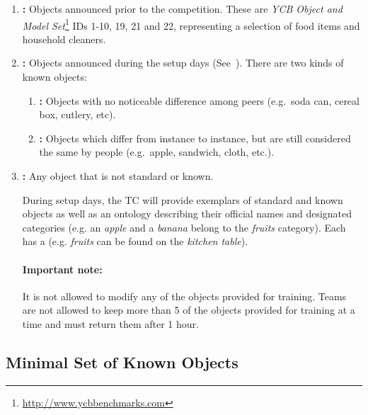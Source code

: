 \begin{enumerate}
	\item \textbf{:} Objects announced prior to the competition.
	These are \textit{YCB Object and Model Set}\footnote{\url{http://www.ycbbenchmarks.com}} IDs 1-10, 19, 21 and 22, representing a selection of food items and household cleaners.

	\item \textbf{:} Objects announced during the setup days (See~).
	There are two kinds of known objects:
	\begin{enumerate}
		\item \textbf{:} Objects with no noticeable difference among peers (e.g.~soda can, cereal box, cutlery, etc).
		\item \textbf{:} Objects which differ from instance to instance, but are still considered the same by people (e.g.~apple, sandwich, cloth, etc.).
	\end{enumerate}

	\item \textbf{:} Any object that is not standard or known.

During setup days, the TC will provide exemplars of standard and known objects as well as an ontology
describing their official names and designated categories (e.g. an \textit{apple} and a \textit{banana} belong to the \textit{fruits} category).
Each  has a  (e.g. \textit{fruits} can be found on the \textit{kitchen table}).

\paragraph*{Important note:} It is not allowed to modify any of the objects provided for training.
Teams are not allowed to keep more than 5 of the objects provided for training at a time and must return them after 1 hour.

\end{enumerate}

\subsection{Minimal Set of Known Objects}
\label{rule:scenario_objects_list}

